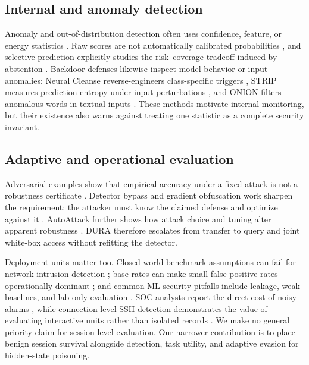 \documentclass[sigconf]{acmart}
\begin{document}
\subsection{Internal and anomaly detection}
Anomaly and out-of-distribution detection often uses confidence, feature, or
energy statistics \cite{hendrycks2017baseline,liang2018odin,liu2020energy}.
Raw scores are not automatically calibrated probabilities
\cite{guo2017calibration}, and selective prediction explicitly studies the
risk--coverage tradeoff induced by abstention \cite{geifman2017selective}.
Backdoor defenses likewise inspect model behavior or input anomalies: Neural
Cleanse reverse-engineers class-specific triggers \cite{wang2019neuralcleanse},
STRIP measures prediction entropy under input perturbations
\cite{gao2019strip}, and ONION filters anomalous words in textual inputs
\cite{qi2021onion}. These methods motivate internal monitoring, but their
existence also warns against treating one statistic as a complete security
invariant.

\subsection{Adaptive and operational evaluation}
Adversarial examples show that empirical accuracy under a fixed attack is not a
robustness certificate \cite{goodfellow2015explaining,carlini2017towards}.
Detector bypass and gradient obfuscation work sharpen the requirement: the
attacker must know the claimed defense and optimize against it
\cite{carlini2017detectors,athalye2018obfuscated}. AutoAttack further shows how
attack choice and tuning alter apparent robustness \cite{croce2020autoattack}.
DURA therefore escalates from transfer to query and joint white-box access
without refitting the detector.

Deployment units matter too. Closed-world benchmark assumptions can fail for
network intrusion detection \cite{sommer2010closedworld}; base rates can make
small false-positive rates operationally dominant
\cite{axelsson2000baserate}; and common ML-security pitfalls include leakage,
weak baselines, and lab-only evaluation \cite{arp2022dosdonts}. SOC analysts
report the direct cost of noisy alarms \cite{alahmadi2022falsepositives}, while
connection-level SSH detection demonstrates the value of evaluating interactive
units rather than isolated records \cite{piet2023ssh}. We make no general
priority claim for session-level evaluation. Our narrower contribution is to
place benign session survival alongside detection, task utility, and adaptive
evasion for hidden-state poisoning.
\end{document}
